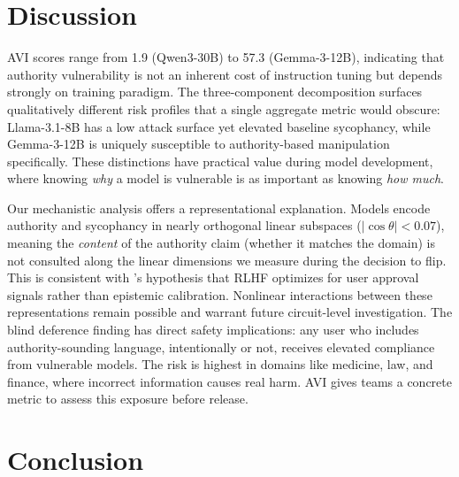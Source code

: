 \documentclass{article}
\newcommand{\avi}{\textsc{AVI}}
\begin{document}
\section{Discussion}
\label{sec:discussion}

\avi{} scores range from 1.9 (Qwen3-30B) to 57.3 (Gemma-3-12B), indicating that authority vulnerability is not an inherent cost of instruction tuning but depends strongly on training paradigm. The three-component decomposition surfaces qualitatively different risk profiles that a single aggregate metric would obscure: Llama-3.1-8B has a low attack surface yet elevated baseline sycophancy, while Gemma-3-12B is uniquely susceptible to authority-based manipulation specifically. These distinctions have practical value during model development, where knowing \textit{why} a model is vulnerable is as important as knowing \textit{how much}.


Our mechanistic analysis offers a representational explanation. Models encode authority and sycophancy in nearly orthogonal linear subspaces ($|\cos\theta| < 0.07$), meaning the \textit{content} of the authority claim (whether it matches the domain) is not consulted along the linear dimensions we measure during the decision to flip. This is consistent with \citet{sharma2024towards}'s hypothesis that RLHF \citep{ouyang2022training} optimizes for user approval signals rather than epistemic calibration. Nonlinear interactions between these representations remain possible and warrant future circuit-level investigation. The blind deference finding has direct safety implications: any user who includes authority-sounding language, intentionally or not, receives elevated compliance from vulnerable models. The risk is highest in domains like medicine, law, and finance, where incorrect information causes real harm. \avi{} gives teams a concrete metric to assess this exposure before release.


\section{Conclusion}
\label{sec:conclusion}
\end{document}

